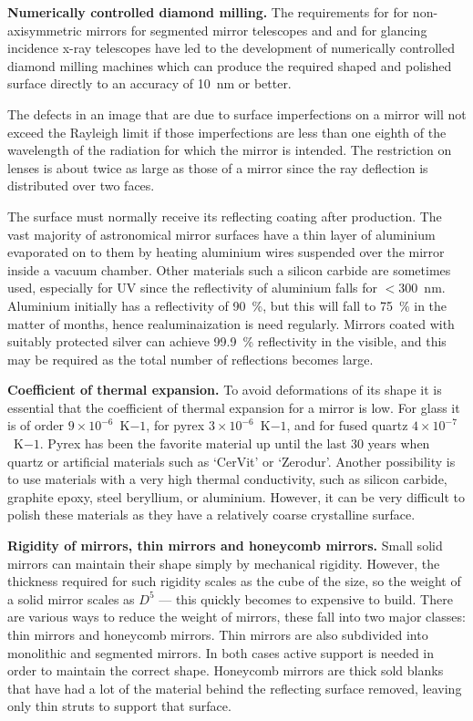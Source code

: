 \noindent
{\bf Numerically controlled diamond milling.} The requirements for for non-axisymmetric
mirrors for segmented mirror telescopes and and for glancing incidence x-ray telescopes
have led to the development of numerically controlled diamond milling machines which 
can produce the required shaped and polished surface directly to an accuracy of 10~nm or
better.

The defects in an image that are due to surface imperfections on a mirror will
not exceed the Rayleigh limit if those imperfections are less than 
one eighth of the wavelength of the radiation for which the mirror is intended.
The restriction on lenses is about twice as large as those of a mirror
since the ray deflection is distributed over two faces. 

The surface must normally receive its reflecting coating after production. The
vast majority of astronomical mirror surfaces have a thin layer of aluminium
evaporated on to them by heating aluminium wires suspended over the mirror 
inside a vacuum chamber. Other materials such a silicon carbide are sometimes
used, especially for UV since the reflectivity of aluminium falls for 
$<300$~nm. Aluminium initially has a reflectivity of 90~\%, but this will
fall to 75~\% in the matter of months, hence realuminaization is need 
regularly. Mirrors coated with suitably protected silver can achieve 99.9~\%
reflectivity in the visible, and this may be required as the total number of
reflections becomes large.

\noindent
{\bf Coefficient of thermal expansion.} To avoid deformations of its shape it is essential
that the coefficient of thermal expansion for a mirror is low. For glass it is of order
$9\times 10^{-6}$~K${-1}$, for pyrex $3\times 10^{-6}$~K${-1}$, and for fused quartz
$4\times 10^{-7}$~K${-1}$. Pyrex has been the favorite material up until the last 30 years
when quartz or artificial materials such as `CerVit' or `Zerodur'. Another possibility is to 
use materials with a very high thermal conductivity, such as silicon carbide, graphite epoxy,
steel beryllium, or aluminium. However, it can be very difficult to polish these materials as
they have a relatively coarse crystalline surface.

\noindent
{\bf Rigidity of mirrors, thin mirrors and honeycomb mirrors.} Small solid mirrors can maintain
their shape simply by mechanical rigidity. However, the thickness required for such rigidity
scales as the cube of the size, so the weight of a solid mirror scales as $D^5$ --- this quickly 
becomes to expensive to build. There are various ways to reduce the weight of mirrors, these
fall into two major classes: thin mirrors and honeycomb mirrors. Thin mirrors are also subdivided
into monolithic and segmented mirrors. In both cases active support is needed in order to 
maintain the correct shape. Honeycomb mirrors are thick sold blanks that have had a lot of
the material behind the reflecting surface removed, leaving only thin struts to support that surface. 

